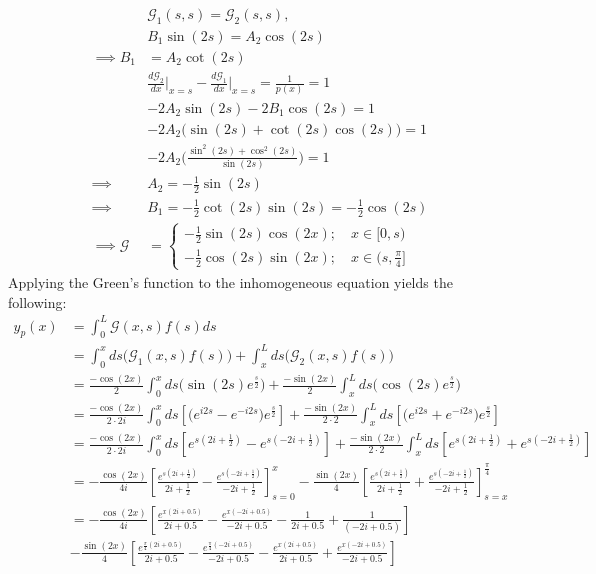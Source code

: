 \documentclass{article}
\begin{document}
\begin{align*}
    &\mathcal{G}_1(s,s) = \mathcal{G}_2(s,s),\\
    &B_1\sin(2s) = A_2\cos(2s)\\
    \implies B_1 &= A_2\cot(2s)\\
    &\frac{d\mathcal{G}_2}{dx}\Big|_{x = s} - \frac{d\mathcal{G}_1}{dx}\Big|_{x = s} = \frac{1}{p(x)} = 1\\
    & -2A_2\sin(2s) - 2B_1\cos(2s) = 1\\
    &-2A_2\Big(\sin(2s) + \cot(2s)\cos(2s)\Big) = 1\\
    &-2A_2\Big(\frac{\sin^2(2s) + \cos^2(2s)}{\sin(2s)}\Big)=1\\
    \implies & A_2 = -\frac{1}{2}\sin(2s)\\
    \implies & B_1 = -\frac{1}{2}\cot(2s)\sin(2s) = -\frac{1}{2}\cos(2s)\\
    \implies \mathcal{G} &= \begin{cases}
        -\frac{1}{2}\sin(2s)\cos(2x); \quad x\in[0,s)\\
        -\frac{1}{2}\cos(2s)\sin(2x); \quad x\in(s,\frac{\pi}{4}]
    \end{cases}
\end{align*}
Applying the Green's function to the inhomogeneous equation yields the following:
\begin{align*}
   y_p(x) &=\int_0^L \mathcal{G}(x,s)f(s)ds\\
    &= \int_0^x ds\Big(\mathcal{G}_1(x,s)f(s)\Big) + \int_x^{L} ds\Big(\mathcal{G}_2(x,s)f(s)\Big)\\
    &= \frac{-\cos(2x)}{2}\int_0^x ds\Big(\sin(2s)e^{\frac{s}{2}}\Big) + \frac{-\sin(2x)}{2}\int_x^{L} ds\Big(\cos(2s)e^{\frac{s}{2}}\Big)\\
    &= \frac{-\cos(2x)}{2\cdot 2i}\int_0^x ds\left[\Big(e^{i2s} - e^{-i2s})e^{\frac{s}{2}}\right] + \frac{-\sin(2x)}{2\cdot 2}\int_x^{L} ds\left[\Big(e^{i2s} + e^{-i2s}\Big)e^{\frac{s}{2}}\right]\\
    &= \frac{-\cos(2x)}{2\cdot 2i}\int_0^x ds\left[e^{s (2i + \frac{1}{2})} - e^{s(-2i + \frac{1}{2})}\right] + \frac{-\sin(2x)}{2\cdot 2}\int_x^{L} ds\left[e^{s(2i + \frac{1}{2})} + e^{s(-2i + \frac{1}{2})}\right]\\
    &=-\frac{\cos(2x)}{4i}\left[\frac{e^{s(2i +\frac{1}{2})}}{2i + \frac{1}{2}}- \frac{e^{s(-2i + \frac{1}{2})}}{-2i + \frac{1}{2}}\right]_{s = 0}^{x} - \frac{\sin(2x)}{4}\left[\frac{e^{s(2i + \frac{1}{2})}}{2i + \frac{1}{2}} + \frac{e^{s(-2i + \frac{1}{2})}}{-2i +\frac{1}{2}}\right]_{s = x} ^{\frac{\pi}{4}}\\
    &=-\frac{\cos(2x)}{4i}\left[\frac{e^{x(2i + 0.5)}}{2i + 0.5} - \frac{e^{x(-2i+0.5)}}{-2i + 0.5} - \frac{1}{2i + 0.5} + \frac{1}{(-2i + 0.5)}\right]\\
    &-\frac{\sin(2x)}{4}\left[\frac{e^{\frac{\pi}{4}(2i + 0.5)}}{2i + 0.5} - \frac{e^{\frac{\pi}{4}(-2i + 0.5)}}{-2i + 0.5} - \frac{e^{x(2i + 0.5)}}{2i + 0.5} + \frac{e^{x(-2i + 0.5)}}{-2i + 0.5}\right]
\end{align*}
\end{document}
